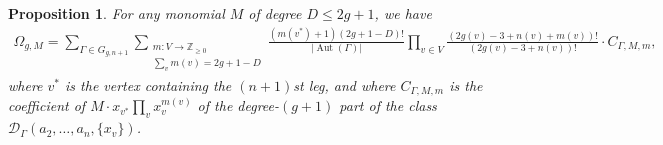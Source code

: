 \documentclass[12pt,reqno]{amsart}
\DeclareMathOperator{\Aut}{Aut}
\theoremstyle{plain}
\newtheorem{proposition}[theorem]{Proposition}
\theoremstyle{definition}
\theoremstyle{remark}
\begin{document}
\begin{proposition}\label{prop:omega_g,m-formula}
  For any monomial $M$ of degree $D \le 2g + 1$, we have
  \begin{align}\label{eqn:omega_g,m-formula}
    \Omega_{g, M}
    = \sum_{\Gamma\in G_{g,n+1}} \sum_{\substack{m\colon V \to \mathbb Z_{\ge 0} \\ \sum_v m(v) = 2g + 1 - D}}
    \frac{(m(v^*) + 1)(2g + 1 - D)!}{|\Aut(\Gamma)|}
    \prod_{v \in V} \frac{(2g(v) - 3 + n(v) + m(v))!}{(2g(v) - 3 + n(v))!} \cdot C_{\Gamma, M, m},
  \end{align}
  where $v^*$ is the vertex containing the $(n + 1)$st leg, and where
  $C_{\Gamma, M, m}$ is the coefficient of
  $M \cdot x_{v^*} \prod_v x_v^{m(v)}$ of the degree-$(g + 1)$ part of
  the class $\mathcal{D}_{\Gamma}(a_2, \dotsc, a_n, \{x_v\})$.
\end{proposition}
\end{document}
